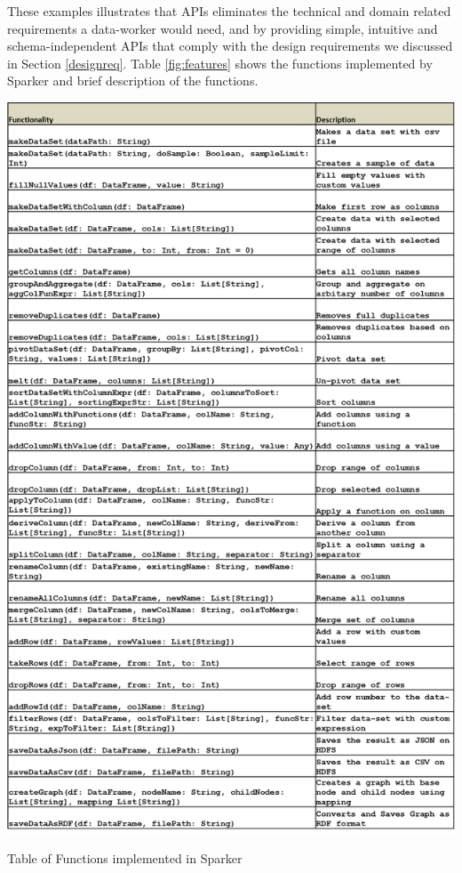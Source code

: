 These examples illustrates that APIs eliminates the technical and domain related requirements a data-worker would need, and by providing simple, intuitive and schema-independent APIs that comply with the design requirements we discussed in Section \ref{designreq}. 
Table \ref{fig:features} shows the functions implemented by Sparker and brief description of the functions. 
\begin{center}
	\includegraphics[width=38em]{./Figures/Picture2}
	\begin{table}[htbp]
    \caption{Table of Functions implemented in Sparker}
    \label{fig:features}
	\end{table}
\end{center}
